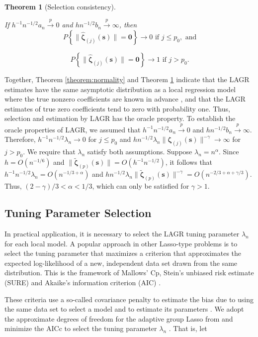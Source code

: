 \documentclass[authoryear,review, 12pt]{elsarticle}
\newtheorem{thm}{Theorem}
\begin{document}
\begin{thm}[Selection consistency]
\label{theorem:selection}



If $h^{-1}n^{-1/2}a_{n}\xrightarrow{p}0$ and $hn^{-1/2}b_{n}\xrightarrow{p}\infty$,
then 
\[
P\left\{ \|\hat{\bm{\zeta}}_{(j)}(\bm{s})\|=\bm{0}\right\} \to0\text{ if }j\le p_{0},\text{ and}
\]
 
\[
P\left\{ \|\hat{\bm{\zeta}}_{(j)}(\bm{s})\|=\bm{0}\right\} \to1\text{ if }j>p_{0}.
\]
 
\end{thm}
Together, Theorem \ref{theorem:normality} and Theorem \ref{theorem:selection}
indicate that the LAGR estimates have the same asymptotic distribution
as a local regression model where the true nonzero coefficients are
known in advance \citep{Sun-Yan-Zhang-Lu-2014}, and that the LAGR
estimates of true zero coefficients tend to zero with probability
one. Thus, selection and estimation by LAGR has the oracle property.
To establish the oracle properties of LAGR, we assumed that $h^{-1}n^{-1/2}a_{n}\xrightarrow{p}0$
and $hn^{-1/2}b_{n}\xrightarrow{p}\infty$. Therefore, $h^{-1}n^{-1/2}\lambda_{n}\to0$
for $j\le p_{0}$ and $hn^{-1/2}\lambda_{n}\|\bm{\zeta}_{(j)}(\bm{s})\|^{-\gamma}\to\infty$
for $j>p_{0}$. We require that $\lambda_{n}$ satisfy both assumptions.
Suppose $\lambda_{n}=n^{\alpha}$. Since $h=O\left(n^{-1/6}\right)$
and $\|\tilde{\bm{\zeta}}_{(p)}(\bm{s})\|=O\left(h^{-1}n^{-1/2}\right)$,
it follows that $h^{-1}n^{-1/2}\lambda_{n}=O\left(n^{-1/3+\alpha}\right)$
and $hn^{-1/2}\lambda_{n}\|\tilde{\bm{\zeta}}_{(p)}(\bm{s})\|^{-\gamma}=O\left(n^{-2/3+\alpha+\gamma/3}\right)$.
Thus, $\left(2-\gamma\right)/3<\alpha<1/3$, which can only be satisfied
for $\gamma>1$.


\subsection{Tuning Parameter Selection}

In practical application, it is necessary to select the LAGR tuning
parameter $\lambda_{n}$ for each local model. A popular approach
in other Lasso-type problems is to select the tuning parameter that
maximizes a criterion that approximates the expected log-likelihood
of a new, independent data set drawn from the same distribution. This
is the framework of Mallows' Cp, Stein's unbiased risk estimate (SURE)
and Akaike's information criterion (AIC) \citep{Mallows-1973,Stein-1981,Akaike-1973}.

These criteria use a so-called covariance penalty to estimate the
bias due to using the same data set to select a model and to estimate
its parameters \citep{Efron:2004a}. We adopt the approximate degrees
of freedom for the adaptive group Lasso from \citet{Yuan-Lin-2006}
and minimize the AICc to select the tuning parameter $\lambda_{n}$
\citep{Hurvich-1998}. That is, let
\end{document}
